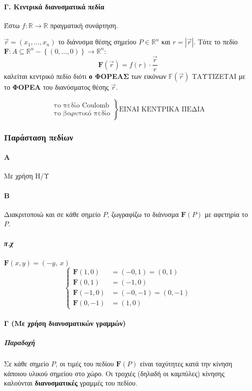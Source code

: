 \documentclass[11pt,a4paper,titlepage,draft]{article}
\newcommand{\textlatin}[1]{#1}
\begin{document}
\paragraph{Γ. Κεντρικά διανυσματικά πεδία}
Έστω $f: \mathbb{R} \to \mathbb{R}$ πραγματική συνάρτηση.

\(\vec r = (x_1,\dots,x_n)\) το διάνυσμα θέσης σημείου $P \in \mathbb R^n$ και $r=|\vec r|$. Τότε το πεδίο $\mathbf F: A \subseteq \mathbb R^n - \left\lbrace (0,\dots,0) \right\rbrace \to \mathbb R^n:$
\[
\boxed{
	\mathbf F(\vec r) = f(r) \cdot \frac{\vec r}{r}
	}
\] καλείται κεντρικό πεδίο διότι \textbf{ο ΦΟΡΕΑΣ} των εικόνων $\mathbb F(\vec r)$ ΤΑΥΤΙΖΕΤΑΙ με το \textbf{ΦΟΡΕΑ} του διανύσματος θέσης $\vec r$.

\[
\left.
\begin{matrix}
\text{το πεδίο \textlatin{Coulomb}}\\
\text{το βαρυτικό πεδίο}
\end{matrix}
\right\rbrace \text{ΕΙΝΑΙ ΚΕΝΤΡΙΚΑ ΠΕΔΙΑ}
\]

\subsubsection{Παράσταση πεδίων}
\paragraph{Α} Με χρήση Η/Υ

\paragraph{Β}
Διακριτοποιώ και σε κάθε σημείο $P$, ζωγραφίζω το διάνυσμα $\mathbf F(P)$ με αφετηρία το $P$.
\subparagraph{π.χ} \(\mathbf F(x,y) = (-y,\ x) \)
\[
\begin{cases}
\mathbf F(1,0) &= (-0,1) = (0,1) \\
\mathbf F(0,1) &= (-1,0) \\
\mathbf F(-1,0) &= (-0,-1) = (0,-1) \\
\mathbf F(0,-1) &= (1,0)
\end{cases}
\]

\paragraph{Γ (Με χρήση διανυσματικών γραμμών)}

\subparagraph{Παραδοχή}
Σε κάθε σημείο $P$, οι τιμές του πεδίου $\mathbf F(P)$ είναι ταχύτητες κατά την κίνηση κάποιου υλικού σημείου στο χώρο. Οι τροχιές (δηλαδή οι καμπύλες) κίνησης καλούνται \textbf{διανυσματικές} γραμμές του πεδίου.
\end{document}
